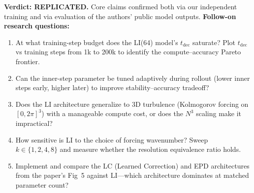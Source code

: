 \noindent\textbf{Verdict: REPLICATED.} Core claims confirmed both via our independent training and via evaluation of the authors' public model outputs.
\noindent\textbf{Follow-on research questions:}
\begin{enumerate}[leftmargin=1.6em,itemsep=0.2em,topsep=0.2em,label=Q\arabic*.]
\item At what training-step budget does the LI(64) model's $t_{\mathrm{dec}}$ saturate? Plot $t_{\mathrm{dec}}$ vs training steps from 1k to 200k to identify the compute--accuracy Pareto frontier.
\item Can the inner-step parameter be tuned adaptively during rollout (lower inner steps early, higher later) to improve stability--accuracy tradeoff?
\item Does the LI architecture generalize to 3D turbulence (Kolmogorov forcing on $[0,2\pi]^3$) with a manageable compute cost, or does the $N^3$ scaling make it impractical?
\item How sensitive is LI to the choice of forcing wavenumber? Sweep $k \in \{1,2,4,8\}$ and measure whether the resolution equivalence ratio holds.
\item Implement and compare the LC (Learned Correction) and EPD architectures from the paper's Fig~5 against LI---which architecture dominates at matched parameter count?
\end{enumerate}

